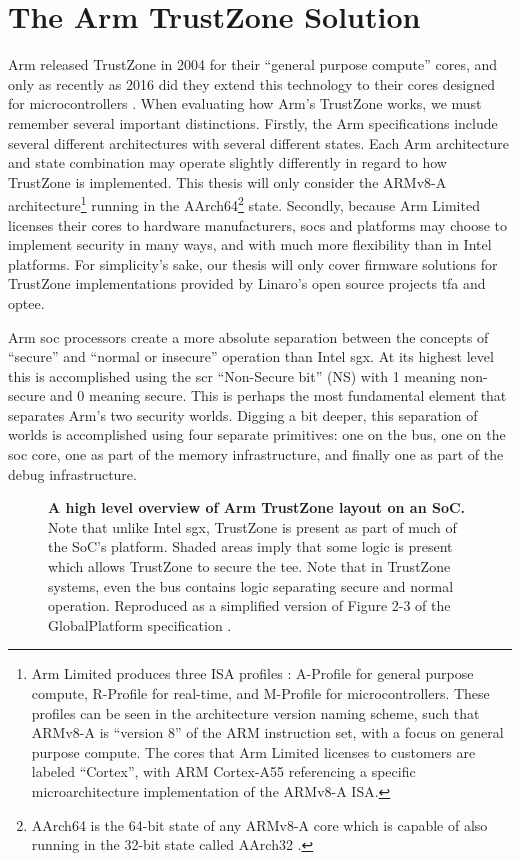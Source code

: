\section{The Arm TrustZone Solution}
Arm released TrustZone in 2004 for their ``general purpose compute'' cores, and only as recently as 2016 did they extend this technology to their cores designed for microcontrollers \cite{Pinto2019}. When evaluating how Arm’s TrustZone works, we must remember several important distinctions. Firstly, the Arm specifications include several different architectures with several different states. Each Arm architecture and state combination may operate slightly differently in regard to how TrustZone is implemented. This thesis will only consider the ARMv8-A architecture\footnote{Arm Limited produces three ISA profiles \cite{ArmBuildingSS}: A-Profile for general purpose compute, R-Profile for real-time, and M-Profile for microcontrollers. These profiles can be seen in the architecture version naming scheme, such that ARMv8-A is ``version 8'' of the ARM instruction set, with a focus on general purpose compute. The cores that Arm Limited licenses to customers are labeled ``Cortex'', with ARM Cortex-A55 referencing a specific microarchitecture implementation of the ARMv8-A ISA.} running in the AArch64\footnote{AArch64 is the 64-bit state of any ARMv8-A core which is capable of also running in the 32-bit state called AArch32 \cite{ArmBuildingSS}.} state. Secondly, because Arm Limited licenses their cores to hardware manufacturers, \glspl{soc} and platforms may choose to implement security in many ways, and with much more flexibility than in Intel platforms. For simplicity’s sake, our thesis will only cover firmware solutions for TrustZone implementations provided by Linaro's open source projects \gls{tfa} and \gls{optee}.
 
Arm \gls{soc} processors create a more absolute separation between the concepts of ``secure'' and ``normal or insecure'' operation than Intel \gls{sgx}. At its highest level this is accomplished using the \gls{scr} ``Non-Secure bit'' (NS) with 1 meaning non-secure and 0 meaning secure. This is perhaps the most fundamental element that separates Arm's two security worlds. Digging a bit deeper, this separation of worlds is accomplished using four separate primitives: one on the bus, one on the \gls{soc} core, one as part of the memory infrastructure, and finally one as part of the debug infrastructure.

\begin{figure}[hb]
\centering

\caption[High Level TrustZone Overview]{\textbf{A high level overview of Arm TrustZone layout on an SoC.} Note that unlike Intel \gls{sgx}, TrustZone is present as part of much of the SoC's platform. Shaded areas imply that some logic is present which allows TrustZone to secure the \gls{tee}. Note that in TrustZone systems, even the bus contains logic separating secure and normal operation. Reproduced as a simplified version of Figure 2-3 of the GlobalPlatform specification \cite{GlobalPlatform2018}.}
\label{fig:tz-hl}
\end{figure}

